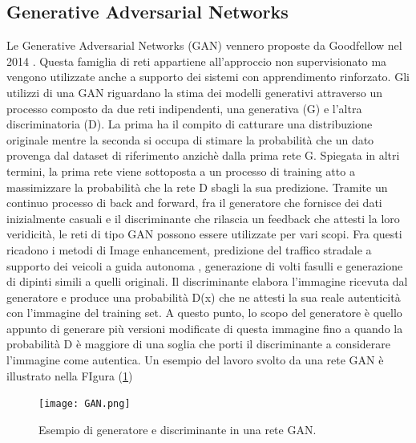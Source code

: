 \subsection{Generative Adversarial Networks}
Le Generative Adversarial Networks (GAN) vennero proposte da Goodfellow 
nel 2014 \cite{GAN}. Questa famiglia di reti appartiene all'approccio non 
supervisionato ma vengono utilizzate anche a supporto dei sistemi con 
apprendimento rinforzato. Gli utilizzi di una GAN riguardano la stima dei 
modelli generativi attraverso un processo composto da due reti indipendenti, 
una generativa (G) e l'altra discriminatoria (D). La prima ha il compito di 
catturare una distribuzione originale mentre la seconda si occupa di stimare 
la probabilità che un dato provenga dal dataset di riferimento anzichè dalla 
prima rete G. Spiegata in altri termini, la prima rete viene sottoposta a 
un processo di training atto a massimizzare la probabilità che la rete D 
sbagli la sua predizione. Tramite un continuo processo di back and forward, 
fra il generatore che fornisce dei dati inizialmente casuali e il discriminante 
che rilascia un feedback che attesti la loro veridicità, le reti di tipo GAN 
possono essere utilizzate per vari scopi. Fra questi ricadono i metodi di 
Image enhancement, predizione del traffico stradale a supporto dei veicoli 
a guida autonoma \cite{GAN-ADAS}, generazione di volti fasulli e generazione di dipinti 
simili a quelli originali. Il discriminante elabora l'immagine ricevuta dal 
generatore e produce una probabilità D(x) che ne attesti la sua reale autenticità 
con l'immagine del training set. A questo punto, lo scopo del 
generatore è quello appunto di generare più versioni modificate di questa 
immagine fino a quando la probabilità D è maggiore di una soglia che porti 
il discriminante a considerare l'immagine come autentica. Un esempio del 
lavoro svolto da una rete GAN è illustrato nella FIgura (\ref{gan-nn})
\begin{figure}
    \centering
    \texttt{[image: GAN.png]}
    \centering
    \caption{Esempio di generatore e discriminante in una rete GAN.}
    \label{gan-nn}
\end{figure}


